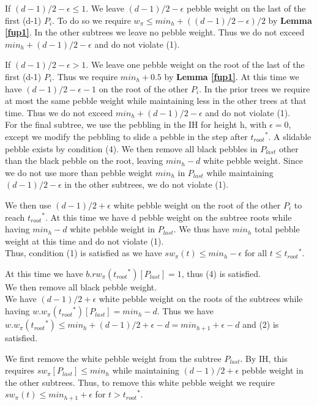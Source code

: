 \documentclass[12pt]{article}
\newcommand{\troots}{{t_{root}}^*}
\begin{document}
If $(d-1)/2 - \epsilon \leq 1$. We leave $(d-1)/2 - \epsilon$ pebble weight on the last of the first (d-1) $P_i$. To do so we require $w_\pi \leq min_h +((d-1)/2 - \epsilon)/2$ by {\bf Lemma \ref{fup1}}. In the other subtrees we leave no pebble weight. Thus we do not exceed $min_h + (d-1)/2-\epsilon$ and do not violate (1).

If $(d-1)/2 - \epsilon > 1$. We leave one pebble weight on the root of the last of the first (d-1) $P_i$. Thus we require $min_h + 0.5$ by {\bf Lemma \ref{fup1}}. At this time we have $(d-1)/2 - \epsilon-1$ on the root of the other $P_i$. In the prior trees we require at most the same pebble weight while maintaining less in the other trees at that time. Thus we do not exceed $min_h + (d-1)/2-\epsilon$ and do not violate (1).\\

For the final subtree, we use the pebbling in the IH for height h, with $\epsilon = 0$, except we modify the pebbling to slide a pebble in the step after $\troots$. A slidable pebble exists by condition (4). We then remove all black pebbles in $P_{last}$ other than the black pebble on the root, leaving $min_h - d$ white pebble weight. Since we do not use more than pebble weight $min_h$ in $P_{last} $ while maintaining $(d-1)/2-\epsilon$ in the other subtrees, we do not violate (1).

We then use $(d-1)/2+\epsilon$ white pebble weight on the root of the other $P_i$ to reach $\troots$. At this time we have d pebble weight on the subtree roots while having $min_h - d$ white pebble weight in $P_{last}$. We thus have $min_h$ total pebble weight at this time and do not violate (1). \\

Thus, condition (1) is satisfied as we have $sw_\pi(t) \leq min_h-\epsilon$ for all $t \leq \troots$.

At this time we have $b.rw_\pi(\troots)[P_{last}] =1$, thus (4) is satisfied.\\

We then remove all black pebble weight.\\

We have $(d-1)/2+\epsilon$ white pebble weight on the roots of the subtrees while having $w.w_\pi(\troots)[P_{last}] = min_h-d$. Thus we have $w.w_\pi(\troots) \leq min_h +(d-1)/2+\epsilon -d = min_{h+1} + \epsilon - d$ and (2) is satisfied.

We first remove the white pebble weight from the subtree $P_{last}$. By IH, this requires $sw_\pi[P_{last}] \leq min_h$ while maintaining $(d-1)/2+\epsilon$ pebble weight in the other subtrees. Thus, to remove this white pebble weight we require $sw_\pi(t) \leq min_{h+1}+\epsilon$ for $t > \troots$.
\end{document}

